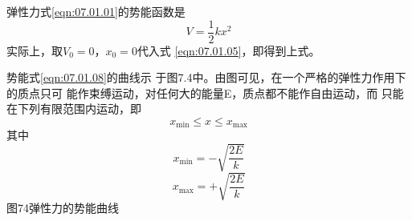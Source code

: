 弹性力\lhbrak 式\eqref{eqn:07.01.01}\rhbrak 的势能函数是
\begin{equation}\label{eqn:07.01.08}
	V = \frac { 1 } { 2 } k x ^ { 2 }  
\end{equation}
实际上，取$  V _ { 0 } = 0   $，$  x _ { 0 } = 0   $代入式
\eqref{eqn:07.01.05}，即得到上式。

势能\lhbrak 式\eqref{eqn:07.01.08}\rhbrak 的曲线示
于图7.4中。由图可见，在一个严格的弹性力作用下的质点只可
能作束缚运动，对任何大的能量E，质点都不能作自由运动，而
只能在下列有限范围内运动，即
{\setlength{\mathindent}{4em}
\begin{equation*}
	x _ { \min } \leqslant x \leqslant x _ { \max }  
\end{equation*}
其中
\begin{equation*}
	x _ { \min } = - \sqrt { \frac { 2 E } { k } }
\end{equation*}
\begin{equation*}
	x _ { \max } = + \sqrt { \frac { 2 E } { k } } 
\end{equation*}}
图74弹性力的势能曲线